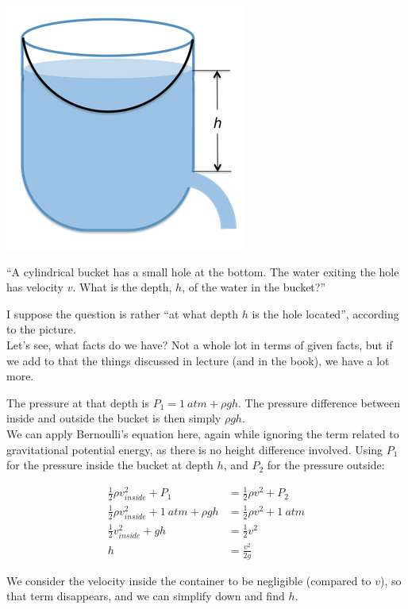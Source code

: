 \documentclass[8.01x]{subfiles}
\begin{document}
\begin{center}
\includegraphics[scale=0.6]{Graphics/h10p6}
\end{center}

``A cylindrical bucket has a small hole at the bottom. The water exiting the hole has velocity $v$. What is the depth, $h$, of the water in the bucket?''

I suppose the question is rather ``at what depth $h$ is the hole located'', according to the picture.\\
Let's see, what facts do we have? Not a whole lot in terms of given facts, but if we add to that the things discussed in lecture (and in the book), we have a lot more.

The pressure at that depth is $P_1 = \SI{1}{atm} + \rho g h$. The pressure difference between inside and outside the bucket is then simply $\rho g h$.\\
We can apply Bernoulli's equation here, again while ignoring the term related to gravitational potential energy, as there is no height difference involved. Using $P_1$ for the pressure inside the bucket at depth $h$, and $P_2$ for the pressure outside:

\begin{align}
\frac{1}{2} \rho v_{inside}^2 + P_1 &= \frac{1}{2} \rho v^2 + P_2\\
\frac{1}{2} \rho v_{inside}^2 + \SI{1}{atm} + \rho g h &= \frac{1}{2} \rho v^2 + \SI{1}{atm}\\
\frac{1}{2} v_{inside}^2 + g h &= \frac{1}{2} v^2\\
h &= \frac{v^2}{2g}
\end{align}

We consider the velocity inside the container to be negligible (compared to $v$), so that term disappears, and we can simplify down and find $h$.
\end{document}
